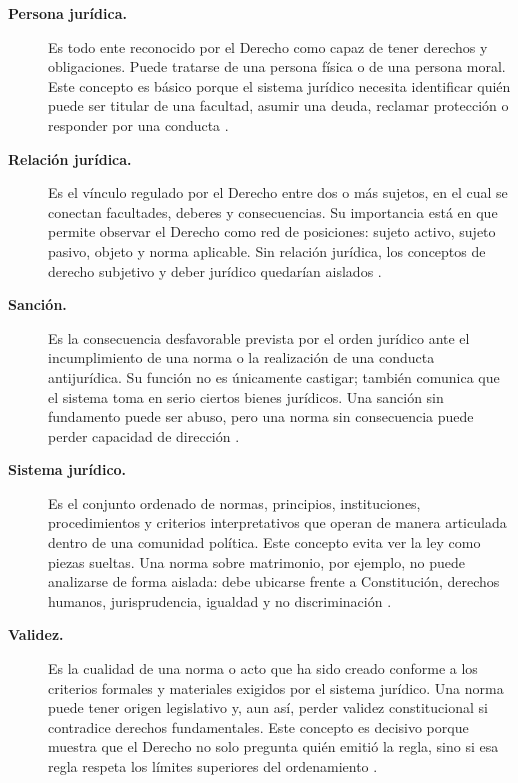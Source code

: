 \documentclass[
	spanish,
	letterpaper, oneside
]{article}
\begin{document}
\begin{description}
\item[\textbf{Persona jurídica.}]
Es todo ente reconocido por el Derecho como capaz de tener derechos y obligaciones. Puede tratarse de una persona física o de una persona moral. Este concepto es básico porque el sistema jurídico necesita identificar quién puede ser titular de una facultad, asumir una deuda, reclamar protección o responder por una conducta \citep{garciaMaynez2002,poderJudicialGto2007}.

\item[\textbf{Relación jurídica.}]
Es el vínculo regulado por el Derecho entre dos o más sujetos, en el cual se conectan facultades, deberes y consecuencias. Su importancia está en que permite observar el Derecho como red de posiciones: sujeto activo, sujeto pasivo, objeto y norma aplicable. Sin relación jurídica, los conceptos de derecho subjetivo y deber jurídico quedarían aislados \citep{poderJudicialGto2007,garciaMaynez2002}.

\item[\textbf{Sanción.}]
Es la consecuencia desfavorable prevista por el orden jurídico ante el incumplimiento de una norma o la realización de una conducta antijurídica. Su función no es únicamente castigar; también comunica que el sistema toma en serio ciertos bienes jurídicos. Una sanción sin fundamento puede ser abuso, pero una norma sin consecuencia puede perder capacidad de dirección \citep{garciaMaynez2002,poderJudicialGto2007}.

\item[\textbf{Sistema jurídico.}]
Es el conjunto ordenado de normas, principios, instituciones, procedimientos y criterios interpretativos que operan de manera articulada dentro de una comunidad política. Este concepto evita ver la ley como piezas sueltas. Una norma sobre matrimonio, por ejemplo, no puede analizarse de forma aislada: debe ubicarse frente a Constitución, derechos humanos, jurisprudencia, igualdad y no discriminación \citep{rojas-gonzalezFilosofiaDerecho2018,garciaMaynez2002}.

\item[\textbf{Validez.}]
Es la cualidad de una norma o acto que ha sido creado conforme a los criterios formales y materiales exigidos por el sistema jurídico. Una norma puede tener origen legislativo y, aun así, perder validez constitucional si contradice derechos fundamentales. Este concepto es decisivo porque muestra que el Derecho no solo pregunta quién emitió la regla, sino si esa regla respeta los límites superiores del ordenamiento \citep{garciaMaynez2002,scjnMatrimonio2015}.

\end{description}
\end{document}
